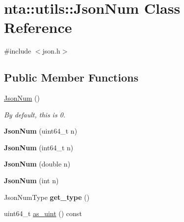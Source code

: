 \hypertarget{classnta_1_1utils_1_1JsonNum}{}\section{nta\+:\+:utils\+:\+:Json\+Num Class Reference}
\label{classnta_1_1utils_1_1JsonNum}


{\ttfamily \#include $<$json.\+h$>$}

\subsection*{Public Member Functions}
\begin{DoxyCompactItemize}
\item 
\mbox{\label{classnta_1_1utils_1_1JsonNum_a4c16668854577689d9ae6e6a9f7fd62d}} 
\hyperlink{classnta_1_1utils_1_1JsonNum_a4c16668854577689d9ae6e6a9f7fd62d}{Json\+Num} ()
\begin{DoxyCompactList}\small\item\em By default, this is 0. \end{DoxyCompactList}\item 
\mbox{\label{classnta_1_1utils_1_1JsonNum_a2a17dbe70a84cd8d202b6ad5b865ec28}} 
{\bfseries Json\+Num} (uint64\+\_\+t n)
\item 
\mbox{\label{classnta_1_1utils_1_1JsonNum_a30dcf42823f7d99800c2eac63fdd8026}} 
{\bfseries Json\+Num} (int64\+\_\+t n)
\item 
\mbox{\label{classnta_1_1utils_1_1JsonNum_a94ecf5200ab6caa555850d96441dae29}} 
{\bfseries Json\+Num} (double n)
\item 
\mbox{\label{classnta_1_1utils_1_1JsonNum_ae4cd0552c7196301f7adf62394ad7e0c}} 
{\bfseries Json\+Num} (int n)
\item 
\mbox{\label{classnta_1_1utils_1_1JsonNum_a9df08dcba9a39706221cd215a295f16c}} 
Json\+Num\+Type {\bfseries get\+\_\+type} ()
\item 
uint64\+\_\+t \hyperlink{classnta_1_1utils_1_1JsonNum_a89e8033a247c3342d99a762f6110d877}{as\+\_\+uint} () const
\item 

\end{DoxyCompactItemize}
